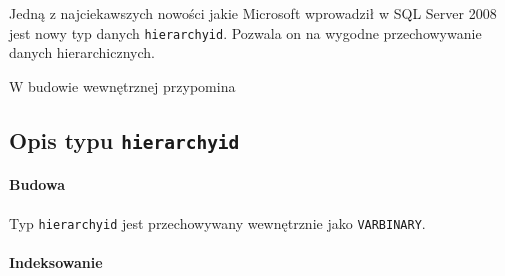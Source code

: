 Jedną z najciekawszych nowości jakie Microsoft wprowadził w SQL Server 2008 jest nowy typ danych \texttt{hierarchyid}. 
Pozwala on na wygodne przechowywanie danych hierarchicznych.

W budowie wewnętrznej przypomina 


\subsection*{Opis typu \texttt{hierarchyid}}

\paragraph{Budowa}

Typ \texttt{hierarchyid} jest przechowywany wewnętrznie jako \texttt{VARBINARY}. 


\paragraph{Indeksowanie}



